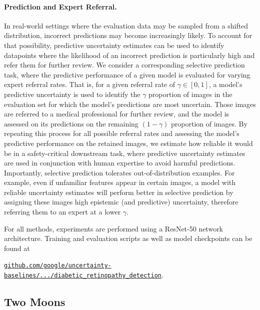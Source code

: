 \begin{appendices}
\paragraph{Prediction and Expert Referral.}
In real-world settings where the evaluation data may be sampled from a shifted distribution, incorrect predictions may become increasingly likely.
To account for that possibility, predictive uncertainty estimates can be used to identify datapoints where the likelihood of an incorrect prediction is particularly high and refer them for further review.
We consider a corresponding selective prediction task, where the predictive performance of a given model is evaluated for varying expert referral rates.
That is, for a given referral rate of $\gamma \in [0, 1]$, a model's predictive uncertainty is used to identify the $\gamma$ proportion of images in the evaluation set for which the model's predictions are most uncertain.
Those images are referred to a medical professional for further review, and the model is assessed on its predictions on the remaining $(1 - \gamma)$ proportion of images.
By repeating this process for all possible referral rates and assessing the model's predictive performance on the retained images, we estimate how reliable it would be in a safety-critical downstream task, where predictive uncertainty estimates are used in conjunction with human expertise to avoid harmful predictions.
Importantly, selective prediction tolerates out-of-distribution examples.
For example, even if unfamiliar features appear in certain images, a model with reliable uncertainty estimates will perform better in selective prediction by assigning these images high epistemic (and predictive) uncertainty, therefore referring them to an expert at a lower $\gamma$.

For all methods, experiments are performed using a ResNet-50 network architecture.
Training and evaluation scripts as well as model checkpoints can be found at
\begin{center}
    \href{https://github.com/google/uncertainty-baselines/tree/main/baselines/diabetic_retinopathy_detection}{\texttt{github.com/google/uncertainty-baselines/.../diabetic\_retinopathy\_detection}}.
\end{center}


\vspace*{-5pt}  
\subsection{Two Moons}


\end{appendices}
